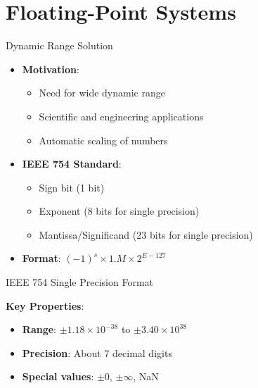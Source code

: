 \documentclass[aspectratio=169,11pt]{beamer}
\newcommand{\concept}[1]{\textbf{\color{accentcolor}#1}}
\begin{document}
\section{Floating-Point Systems}

\begin{frame}{Dynamic Range Solution}
\begin{itemize}
\item \concept{Motivation}:
\begin{itemize}
\item Need for wide dynamic range
\item Scientific and engineering applications
\item Automatic scaling of numbers
\end{itemize}
\vspace{0.5cm}
\item \concept{IEEE 754 Standard}:
\begin{itemize}
\item Sign bit (1 bit)
\item Exponent (8 bits for single precision)
\item Mantissa/Significand (23 bits for single precision)
\end{itemize}
\vspace{0.3cm}
\item \concept{Format}: $(-1)^s \times 1.M \times 2^{E-127}$
\end{itemize}
\end{frame}

\begin{frame}{IEEE 754 Single Precision Format}
\begin{center}
\end{center}

\vspace{0.5cm}
\concept{Key Properties}:
\begin{itemize}
\item \textbf{Range}: $\pm 1.18 \times 10^{-38}$ to $\pm 3.40 \times 10^{38}$
\item \textbf{Precision}: About 7 decimal digits
\item \textbf{Special values}: $\pm 0$, $\pm \infty$, NaN
\end{itemize}
\end{frame}
\end{document}
